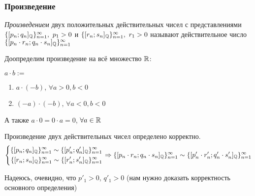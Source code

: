 \subsubsection*{Произведение}

\begin{definition}
    \textit{Произведением} двух положительных действительных чисел с представлениями $\{[p_n;q_n]_{\mathbb{Q}}\}_{n = 1}^\infty,\ p_1 > 0$ и $\{[r_n;s_n]_{\mathbb{Q}}\}_{n = 1}^\infty,\ r_1 > 0$ называют действительное число $\{[p_n \cdot r_n;q_n \cdot s_n]_{\mathbb{Q}}\}_{n = 1}^\infty$
\end{definition}

Доопределим произведение на всё множество $\mathbb{R}$:

$a \cdot b :=$
\begin{enumerate}
    \item $a \cdot (-b)$, $\forall a > 0, b < 0$
    \item $(-a) \cdot (-b)$, $\forall a < 0, b < 0$
\end{enumerate}

А также $a \cdot 0 = 0 \cdot a = 0$, $\forall a \in \mathbb{R}$

\begin{proposition}
    Произведение двух действительных чисел определено корректно.
    $$
        \left\{\begin{aligned}\{[p_n; q_n]_{\mathbb{Q}}\}_{n = 1}^\infty \sim \{[p'_n; q'_n]_{\mathbb{Q}}\}_{n = 1}^\infty \\ 
            \{[r_n; s_n]_{\mathbb{Q}}\}_{n = 1}^\infty \sim \{[r'_n; s'_n]_{\mathbb{Q}}\}_{n = 1}^\infty\end{aligned}\right.
    \Rightarrow
    \{[p_n \cdot r_n; q_n \cdot s_n]_{\mathbb{Q}}\}_{n = 1}^\infty \sim \{[p'_n \cdot r'_n; q'_n \cdot s'_n]_{\mathbb{Q}}\}_{n = 1}^\infty
    $$
\end{proposition}

\begin{anote}
    Надеюсь, очевидно, что $p'_1 > 0$, $q'_1 > 0$ (нам нужно доказать корректность основного определения)
\end{anote}

